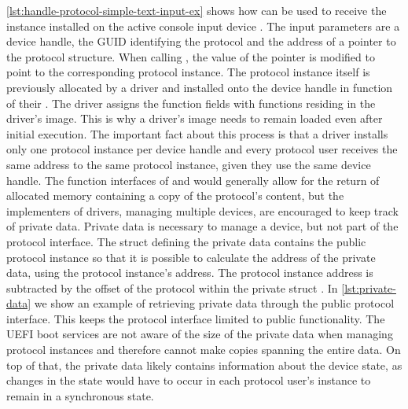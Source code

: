 \autoref{lst:handle-protocol-simple-text-input-ex} shows how  can be used to receive the  instance installed on the active console input device \cite[Section 4.3]{uefi-spec}.
The input parameters are a device handle, the \ac{GUID} identifying the protocol and the address of a pointer to the protocol structure.
When calling , the value of the pointer is modified to point to the corresponding protocol instance.
The protocol instance itself is previously allocated by a driver and installed onto the device handle in  function of their .
The driver assigns the function fields with functions residing in the driver's image.
This is why a driver's image needs to remain loaded even after initial execution.
The important fact about this process is that a driver installs only one protocol instance per device handle and every protocol user receives the same address to the same protocol instance, given they use the same device handle.
The function interfaces of  and  would generally allow for the return of allocated memory containing a copy of the protocol's content, but the implementers of drivers, managing multiple devices, are encouraged to keep track of private data.
Private data is necessary to manage a device, but not part of the protocol interface.
The struct defining the private data contains the public protocol instance so that it is possible to calculate the address of the private data, using the protocol instance's address.
The protocol instance address is subtracted by the offset of the protocol within the private struct \cite[Section 8]{tianocore-edk2-driver-writer-s-guide}.
In \autoref{lst:private-data} we show an example of retrieving private data through the public protocol interface.
This keeps the protocol interface limited to public functionality.
The \ac{UEFI} boot services are not aware of the size of the private data when managing protocol instances and therefore cannot make copies spanning the entire data.
On top of that, the private data likely contains information about the device state, as changes in the state would have to occur in each protocol user's instance to remain in a synchronous state.

\vspace{1em}



